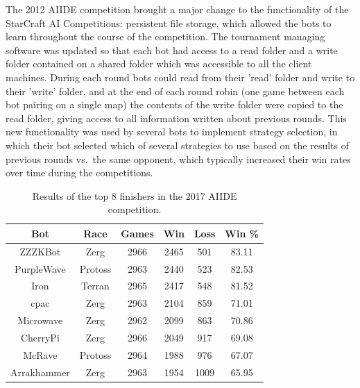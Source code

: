 The 2012 AIIDE competition brought a major change to the functionality of the StarCraft AI Competitions: persistent file storage, which allowed the bots to learn throughout the course of the competition. The tournament managing software was updated so that each bot had access to a read folder and a write folder contained on a shared folder which was accessible to all the client machines. During each round bots could read from their 'read' folder and write to their 'write' folder, and at the end of each round robin (one game between each bot pairing on a single map) the contents of the write folder were copied to the read folder, giving access to all information written about previous rounds. This new functionality was used by several bots to implement strategy selection, in which their bot selected which of several strategies to use based on the results of previous rounds vs.\ the same opponent, which typically increased their win rates over time during the competitions.


\begin{table}[t]
\begin{center}
	\begin{tabular}{| c | c | c | c | c | c |}
		\hline
		\textbf{Bot} & \textbf{Race} & \textbf{Games} & \textbf{Win} & \textbf{Loss} & \textbf{Win \%} \\
		\hline
		ZZZKBot & Zerg & 2966 & 2465 & 501 & 83.11 \\
		\hline
		PurpleWave & Protoss & 2963 & 2440 & 523 & 82.53 \\
		\hline
		Iron & Terran & 2965 & 2417 & 548 & 81.52 \\
		\hline
		cpac & Zerg & 2963 & 2104 & 859 & 71.01 \\
		\hline
		Microwave & Zerg & 2962 & 2099 & 863 & 70.86 \\
		\hline
		CherryPi & Zerg & 2966 & 2049 & 917 & 69.08 \\
		\hline
		McRave & Protoss & 2964 & 1988 & 976 & 67.07 \\
		\hline
		Arrakhammer & Zerg & 2963 & 1954 & 1009 & 65.95 \\
		\hline
 \end{tabular}
 \end{center}  
 \caption{Results of the top 8 finishers in the 2017 AIIDE competition.}
 \label{tableAIIDE}
\end{table} 

